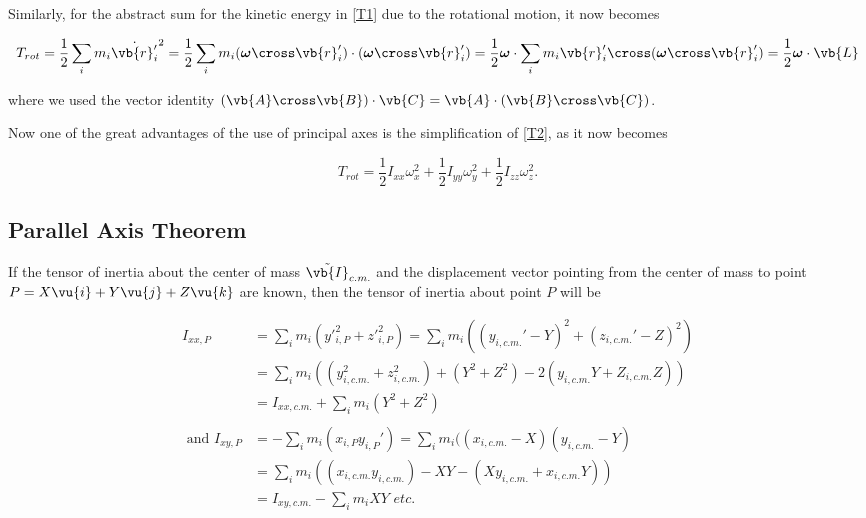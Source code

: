 \documentclass[a4paper,12pt]{report}
\begin{document}
Similarly, for the abstract sum for the kinetic energy in \cref{T1} due to the rotational motion, it now becomes

\begin{equation}
	T_{rot} = \frac{1}{2} \sum_{i}^{} m_{i} \dot{\vb{r} '_{i} } ^2 = \frac{1}{2} \sum_{i}^{} m_{i} (\boldsymbol{\omega } \cross \vb{r} '_{i} ) \cdot (\boldsymbol{\omega } \cross \vb{r} '_{i} ) = \frac{1}{2} \boldsymbol{\omega } \cdot \sum_{i}^{} m_{i} \vb{r} '_{i} \cross (\boldsymbol{\omega } \cross \vb{r} '_{i} ) = \frac{1}{2} \boldsymbol{\omega }  \cdot \vb{L}  \label{T2} 
\end{equation}

where we used the vector identity \((\vb{A} \cross \vb{B} )\cdot \vb{C} = \vb{A} \cdot (\vb{B} \cross \vb{C} )\). 

Now one of the great advantages of the use of principal axes is the simplification of \cref{T2}, as it now becomes  

\begin{equation}
	T_{rot} = \frac{1}{2} I_{xx} \omega _{x} ^2 + \frac{1}{2} I_{yy} \omega _{y} ^2 + \frac{1}{2} I_{zz} \omega _{z} ^2.  
\end{equation}

\subsection{Parallel Axis Theorem}

If the tensor of inertia about the center of mass \(\tilde{\vb{I} } _{c.m. } \) and the displacement vector pointing from the center of mass to point \(P = X \vu{i} + Y \vu{j} + Z\vu{k} \) are known, then the tensor of inertia about point \(P\) will be 

\begin{equation}
\begin{aligned}
	I_{xx,P} &= \sum_{i}^{} m_{i} (y'^2_{i,P} + z'^2_{i,P}) = \sum_{i}^{} m_{i} ( (y_{i,c.m. }' - Y)^2 + (z_{i,c.m. }' -Z)^2) \\ &= \sum_{i}^{} m_{i} ((y_{i,c.m.} ^2 + z_{i,c.m.} ^2)+(Y^2+Z^2) -2(y_{i,c.m. } Y+Z_{i,c.m. } Z)) \\ &= I_{xx,c.m. } + \sum_{i}^{ } m_{i} (Y^2+Z^2)  \\ \\
	\text{ and } I_{xy,P} &= -\sum_{i}^{} m_{i} ( x_{i,P} y_{i,P} ') = \sum_{i}^{} m_{i} ((x_{i,c.m. } -X)(y_{i,c.m. } -Y) \\ &= \sum_{i}^{} m_{i} ((x_{i,c.m. } y_{i,c.m. } ) - XY -(Xy_{i,c.m. } + x_{i,c.m. } Y)) \\ &= I_{xy,c.m. } - \sum_{i}^{} m_{i} XY \textit{ etc.}  
\end{aligned}
\end{equation}
\end{document}

